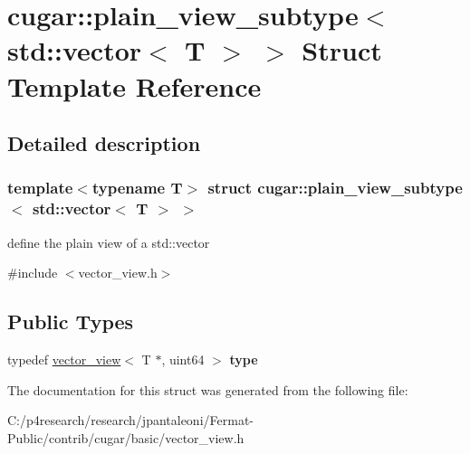 \hypertarget{structcugar_1_1plain__view__subtype_3_01std_1_1vector_3_01_t_01_4_01_4}{}\section{cugar\+:\+:plain\+\_\+view\+\_\+subtype$<$ std\+:\+:vector$<$ T $>$ $>$ Struct Template Reference}
\label{structcugar_1_1plain__view__subtype_3_01std_1_1vector_3_01_t_01_4_01_4}


\subsection{Detailed description}
\subsubsection*{template$<$typename T$>$\newline
struct cugar\+::plain\+\_\+view\+\_\+subtype$<$ std\+::vector$<$ T $>$ $>$}

define the plain view of a std\+::vector 

{\ttfamily \#include $<$vector\+\_\+view.\+h$>$}

\subsection*{Public Types}
\begin{DoxyCompactItemize}
\item 
\mbox{\label{structcugar_1_1plain__view__subtype_3_01std_1_1vector_3_01_t_01_4_01_4_a50fddd0b0a947eedcb0a8c9739d74e5c}} 
typedef \hyperlink{structcugar_1_1vector__view}{vector\+\_\+view}$<$ T $\ast$, uint64 $>$ {\bfseries type}
\end{DoxyCompactItemize}


The documentation for this struct was generated from the following file\+:\begin{DoxyCompactItemize}
\item 
C\+:/p4research/research/jpantaleoni/\+Fermat-\/\+Public/contrib/cugar/basic/vector\+\_\+view.\+h\end{DoxyCompactItemize}
